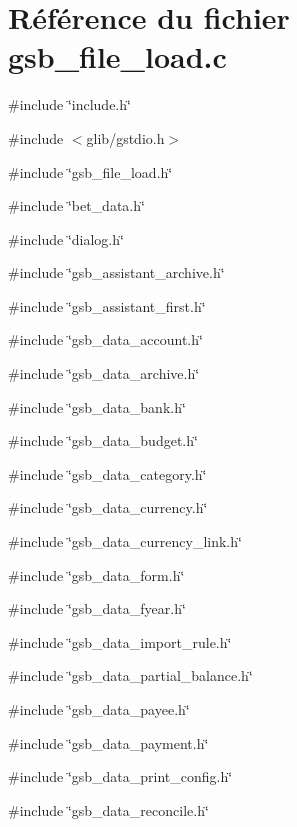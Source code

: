 \section{Référence du fichier gsb\_\-file\_\-load.c}
\label{gsb__file__load_8c}
{\ttfamily \#include \char`\"{}include.h\char`\"{}}\par
{\ttfamily \#include $<$glib/gstdio.h$>$}\par
{\ttfamily \#include \char`\"{}gsb\_\-file\_\-load.h\char`\"{}}\par
{\ttfamily \#include \char`\"{}bet\_\-data.h\char`\"{}}\par
{\ttfamily \#include \char`\"{}dialog.h\char`\"{}}\par
{\ttfamily \#include \char`\"{}gsb\_\-assistant\_\-archive.h\char`\"{}}\par
{\ttfamily \#include \char`\"{}gsb\_\-assistant\_\-first.h\char`\"{}}\par
{\ttfamily \#include \char`\"{}gsb\_\-data\_\-account.h\char`\"{}}\par
{\ttfamily \#include \char`\"{}gsb\_\-data\_\-archive.h\char`\"{}}\par
{\ttfamily \#include \char`\"{}gsb\_\-data\_\-bank.h\char`\"{}}\par
{\ttfamily \#include \char`\"{}gsb\_\-data\_\-budget.h\char`\"{}}\par
{\ttfamily \#include \char`\"{}gsb\_\-data\_\-category.h\char`\"{}}\par
{\ttfamily \#include \char`\"{}gsb\_\-data\_\-currency.h\char`\"{}}\par
{\ttfamily \#include \char`\"{}gsb\_\-data\_\-currency\_\-link.h\char`\"{}}\par
{\ttfamily \#include \char`\"{}gsb\_\-data\_\-form.h\char`\"{}}\par
{\ttfamily \#include \char`\"{}gsb\_\-data\_\-fyear.h\char`\"{}}\par
{\ttfamily \#include \char`\"{}gsb\_\-data\_\-import\_\-rule.h\char`\"{}}\par
{\ttfamily \#include \char`\"{}gsb\_\-data\_\-partial\_\-balance.h\char`\"{}}\par
{\ttfamily \#include \char`\"{}gsb\_\-data\_\-payee.h\char`\"{}}\par
{\ttfamily \#include \char`\"{}gsb\_\-data\_\-payment.h\char`\"{}}\par
{\ttfamily \#include \char`\"{}gsb\_\-data\_\-print\_\-config.h\char`\"{}}\par
{\ttfamily \#include \char`\"{}gsb\_\-data\_\-reconcile.h\char`\"{}}\par
